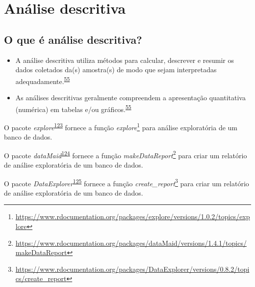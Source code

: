 \documentclass[
  a4paper,
]{book}
\renewcommand{\href}[2]{#2\footnote{\url{#1}}}
\newenvironment{infobox}[1]
  {
  \begin{itemize}
  \renewcommand{\labelitemi}{
    \raisebox{-.7\height}[0pt][0pt]{
      {\setkeys{Gin}{width=3em,keepaspectratio}
        \texttt{[image: \#1]}}
    }
  }
  \setlength{\fboxsep}{1em}
  \begin{blackbox}
  \item
  }
  {
  \end{blackbox}
  \end{itemize}
  }
\begin{document}
\hypertarget{descritiva}{%
\section{Análise descritiva}\label{descritiva}}

\hypertarget{o-que-uxe9-anuxe1lise-descritiva}{%
\subsection{O que é análise descritiva?}\label{o-que-uxe9-anuxe1lise-descritiva}}

\begin{itemize}
\item
  A análise descritiva utiliza métodos para calcular, descrever e resumir os dados coletados da(s) amostra(s) de modo que sejam interpretadas adequadamente.\textsuperscript{\protect\hyperlink{ref-vetter2017}{55}}
\item
  As análises descritivas geralmente compreendem a apresentação quantitativa (numérica) em tabelas e/ou gráficos.\textsuperscript{\protect\hyperlink{ref-vetter2017}{55}}
\end{itemize}

\begin{infobox}{images/Rlogo}
O pacote \emph{explore}\textsuperscript{\protect\hyperlink{ref-explore}{123}} fornece a função \href{https://www.rdocumentation.org/packages/explore/versions/1.0.2/topics/explore}{\emph{explore}} para análise exploratória de um banco de dados.

\end{infobox}

\begin{infobox}{images/Rlogo}
O pacote \emph{dataMaid}\textsuperscript{\protect\hyperlink{ref-dataMaid}{124}} fornece a função \href{https://www.rdocumentation.org/packages/dataMaid/versions/1.4.1/topics/makeDataReport}{\emph{makeDataReport}} para criar um relatório de análise exploratória de um banco de dados.

\end{infobox}

\begin{infobox}{images/Rlogo}
O pacote \emph{DataExplorer}\textsuperscript{\protect\hyperlink{ref-DataExplorer-2}{125}} fornece a função \href{https://www.rdocumentation.org/packages/DataExplorer/versions/0.8.2/topics/create_report}{\emph{create\_report}} para criar um relatório de análise exploratória de um banco de dados.

\end{infobox}
\end{document}
